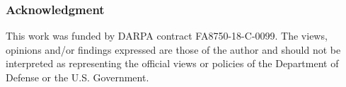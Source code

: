 \documentclass[conference]{IEEEtran}
\begin{document}




















\subsubsection*{Acknowledgment}
This work was funded by DARPA contract  FA8750-18-C-0099. The views, opinions and/or
findings expressed are those of the author and should not be interpreted as representing
the official views or policies of the Department of Defense or the U.S. Government.



\end{document}
